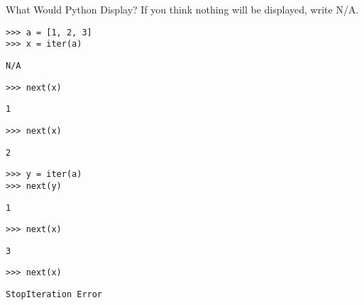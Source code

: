 \begin{blocksection}
\question What Would Python Display? If you think nothing will be displayed, write N/A.

\begin{lstlisting}
>>> a = [1, 2, 3]
>>> x = iter(a)
\end{lstlisting}
\begin{solution}[0.2in]
\begin{lstlisting}
N/A
\end{lstlisting}
\end{solution}

\begin{lstlisting}
>>> next(x)
\end{lstlisting}
\begin{solution}[0.2in]
\begin{lstlisting}
1
\end{lstlisting}
\end{solution}

\begin{lstlisting}
>>> next(x)
\end{lstlisting}
\begin{solution}[0.2in]
\begin{lstlisting}
2
\end{lstlisting}
\end{solution}

\begin{lstlisting}
>>> y = iter(a)
>>> next(y)
\end{lstlisting}
\begin{solution}[0.2in]
\begin{lstlisting}
1
\end{lstlisting}
\end{solution}

\begin{lstlisting}
>>> next(x)
\end{lstlisting}
\begin{solution}[0.2in]
\begin{lstlisting}
3
\end{lstlisting}
\end{solution}

\begin{lstlisting}
>>> next(x)
\end{lstlisting}
\begin{solution}[0.2in]
\begin{lstlisting}
StopIteration Error
\end{lstlisting}
\end{solution}


\end{blocksection}
